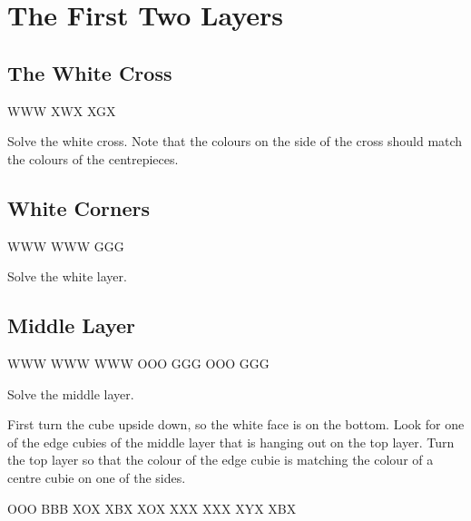 \documentclass{article}
\begin{document}
    \section{The First Two Layers}

    \subsection{The White Cross}

    \RubikCubeGreyWY
     {W}{W}{W} {X}{W}{X}
     {X}{G}{X}

    \begin{goal}
        Solve the white cross.
        Note that the colours on the side of the cross should match the colours of the centrepieces.
    \end{goal}


    \subsection{White Corners}

    \RubikCubeGreyWY
     {W}{W}{W} {W}{W}{W}
     {G}{G}{G}

    \begin{goal}
        Solve the white layer.
    \end{goal}


    \subsection{Middle Layer}

    \RubikCubeGreyWY
    \RubikFaceUp WWW WWW WWW
    \RubikSliceTopR OOO GGG
    \RubikSliceMiddleR OOO GGG

    \begin{goal}
        Solve the middle layer.
    \end{goal}

    First turn the cube upside down, so the white face is on the bottom.
    Look for one of the edge cubies of the middle layer that is hanging out on the top layer.
    Turn the top layer so that the colour of the edge cubie is matching the colour of a centre cubie on one of the sides.

    \RubikSliceBottomR OOO BBB
    \RubikSliceMiddleR XOX XBX
    \RubikSliceTopR XOX XXX
    \RubikFaceUp XXX XYX XBX

    \textcube{}
\end{document}
